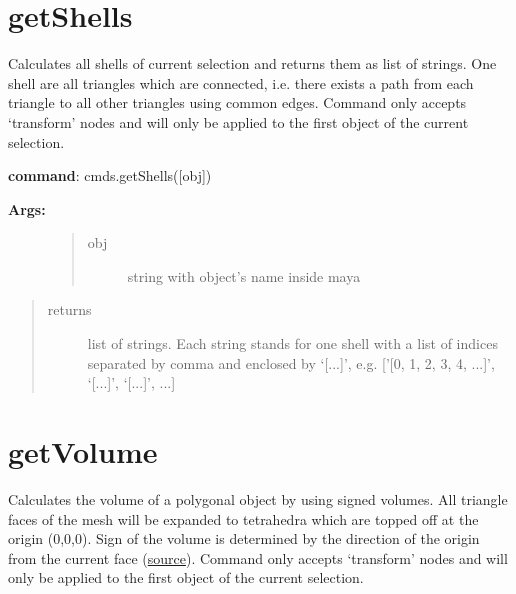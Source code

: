 \documentclass[letterpaper,10pt,english]{sphinxmanual}
\begin{document}
\section{getShells}
\label{pk_src.getShells:getshells}\label{pk_src.getShells::doc}\label{pk_src.getShells:id1}
{\hyperref[index:commands]{}}
\label{pk_src.getShells:module-pk_src.getShells}
Calculates all shells of current selection and returns them as list of strings. One shell are all triangles which are connected, i.e. there exists a path from each triangle to all other triangles using common edges.
Command only accepts `transform' nodes and will only be applied to the first object of the current selection.

\textbf{command}: cmds.getShells({[}obj{]})
\begin{description}
\item[{\textbf{Args:}}] \leavevmode\begin{quote}\begin{description}
\item[{obj}] \leavevmode
string with object's name inside maya

\end{description}\end{quote}

\end{description}
\begin{quote}\begin{description}
\item[{returns}] \leavevmode
list of strings. Each string stands for one shell with a list of indices separated by comma and enclosed by `{[}...{]}', e.g. {[}'{[}0, 1, 2, 3, 4, ...{]}', `{[}...{]}', `{[}...{]}', ...{]}

\end{description}\end{quote}


\section{getVolume}
\label{pk_src.getVolume:getvolume}\label{pk_src.getVolume::doc}\label{pk_src.getVolume:id1}
{\hyperref[index:commands]{}}
\label{pk_src.getVolume:module-pk_src.getVolume}
Calculates the volume of a polygonal object by using signed volumes.
All triangle faces of the mesh will be expanded to tetrahedra which are topped off at the origin (0,0,0). Sign of the volume is determined by the direction of the origin from the current face
(\href{http://stackoverflow.com/questions/1406029/how-to-calculate-the-volume-of-a-3d-mesh-object-the-surface-of-which-is-made-up}{source}).
Command only accepts `transform' nodes and will only be applied to the first object of the current selection.
\end{document}
